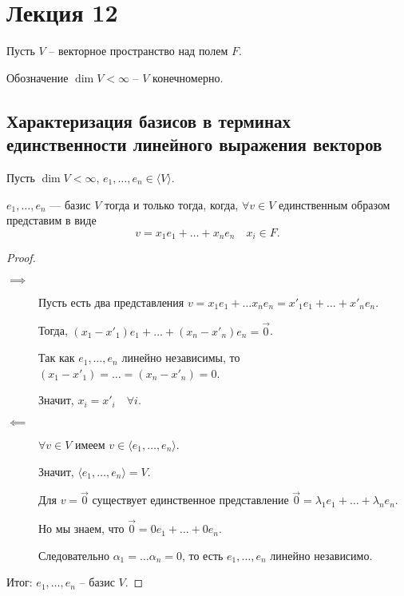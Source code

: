 \section{Лекция 12}

Пусть $V$ -- векторное пространство над полем $F$.

Обозначение $\dim V < \infty$ -- $V$ конечномерно.

\subsection{Характеризация базисов в терминах единственности линейного выражения векторов}

\begin{proposition}
    Пусть $\dim V < \infty$, $e_1, \dots, e_n \in \langle V \rangle$.

    $e_1, \dots, e_n$ --- базис $V$ тогда и только тогда, когда, $\forall v \in V$ единственным образом представим в виде
    \begin{equation*}
        v = x_1 e_1 + \dots + x_n e_n \quad x_i \in F
    .\end{equation*}
\end{proposition}

\begin{proof}~
    \begin{description}
    \item[$\implies$]
        Пусть есть два представления $v = x_1 e_1 + \dots x_n e_n = x'_1 e_1 + \dots + x'_n e_n$.

        Тогда, $(x_1 - x'_1)e_1 + \dots + (x_n - x'_n)e_n = \overrightarrow{0}$.

        Так как $e_1, \dots, e_n$ линейно независимы, то $(x_1 - x'_1) = \dots = (x_n - x'_n) = 0$.

        Значит, $x_i = x'_i \quad \forall i$.

    \item[$\impliedby$]
        $\forall v \in V$ имеем $v \in \langle e_1, \dots, e_n \rangle$.

        Значит, $\langle e_1, \dots, e_n \rangle = V$.

        Для $v = \overrightarrow{0}$ существует единственное представление $\overrightarrow{0} = \lambda_1 e_1 + \dots + \lambda_n e_n$.

        Но мы знаем, что $\overrightarrow{0} = 0e_1 + \dots + 0e_n$.

        Следовательно $\alpha_1 = \dots \alpha_n = 0$, то есть $e_1, \dots, e_n$ линейно независимо.
    \end{description}

    Итог: $e_1, \dots, e_n$ -- базис $V$.
\end{proof}


